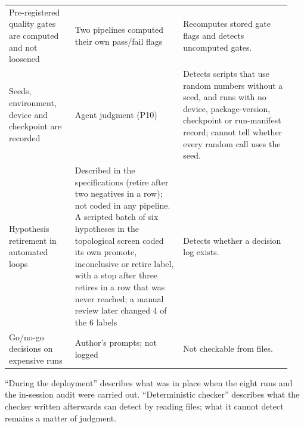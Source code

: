 {\begin{longtable}{@{}p{0.22\linewidth}p{0.36\linewidth}p{0.36\linewidth}@{}}
Pre-registered quality gates are computed and not loosened & Two
pipelines computed their own pass/fail flags & Recomputes stored gate
flags and detects uncomputed gates. \\
Seeds, environment, device and checkpoint are recorded & Agent judgment
(P10) & Detects scripts that use random numbers without a seed, and runs
with no device, package-version, checkpoint or run-manifest record;
cannot tell whether every random call uses the seed. \\
Hypothesis retirement in automated loops & Described in the
specifications (retire after two negatives in a row); not coded in any
pipeline. A scripted batch of six hypotheses in the topological screen
coded its own promote, inconclusive or retire label, with a stop after
three retires in a row that was never reached; a manual review later
changed 4 of the 6 labels & Detects whether a decision log exists. \\
Go/no-go decisions on expensive runs & Author's prompts; not logged &
Not checkable from files. \\
\end{longtable}
\begin{flushleft}
``During
the deployment'' describes what was in place when the eight runs and the
in-session audit were carried out. ``Deterministic checker'' describes
what the checker written afterwards can detect by reading files; what it
cannot detect remains a matter of judgment.
\end{flushleft}
}


